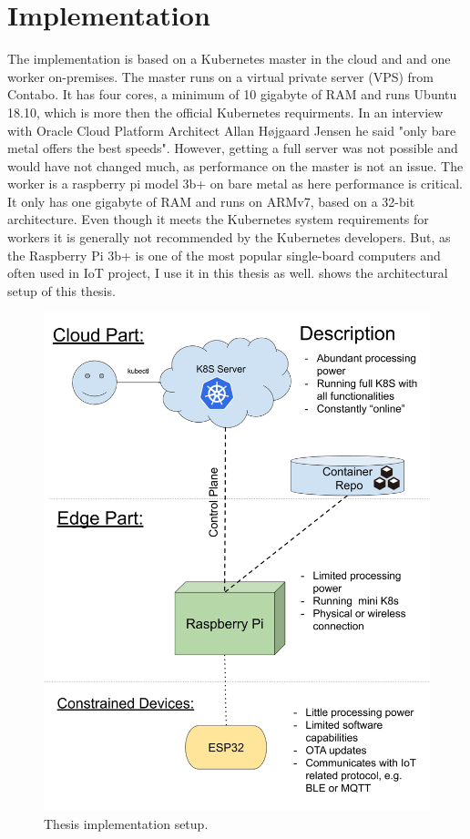 \section{Implementation} \label{sec:implementation}
The implementation is based on a Kubernetes master in the cloud and and one worker on-premises. The master runs on a virtual private server (VPS) from Contabo\cite{online:ContaboWebsite}. 
It has four cores, a minimum of 10 gigabyte of RAM and runs Ubuntu 18.10, which is more then the official Kubernetes requirments\cite{kubernetesRequirementsInstall:online}. 
In an interview with Oracle Cloud Platform Architect Allan H{\o}jgaard Jensen he said "only bare metal offers the best speeds". However, getting a full server was not possible and would have not changed much, as performance on the master is not an issue. The worker is a raspberry pi model 3b+ on bare metal as here performance is critical. 
It only has one gigabyte of RAM and runs on ARMv7, based on a 32-bit architecture. Even though it meets the Kubernetes system requirements for workers it is generally not recommended by the Kubernetes developers. But, as the Raspberry Pi 3b+ is one of the most popular single-board computers and often used in IoT project, I use it in this thesis as well.  shows the architectural setup of this thesis.
\begin{figure}[h!]
    \centering
    \includegraphics[scale=0.15]{figures/baSetup.png}
    \caption{Thesis implementation setup.}
    \label{fig:baSetup}
\end{figure}
